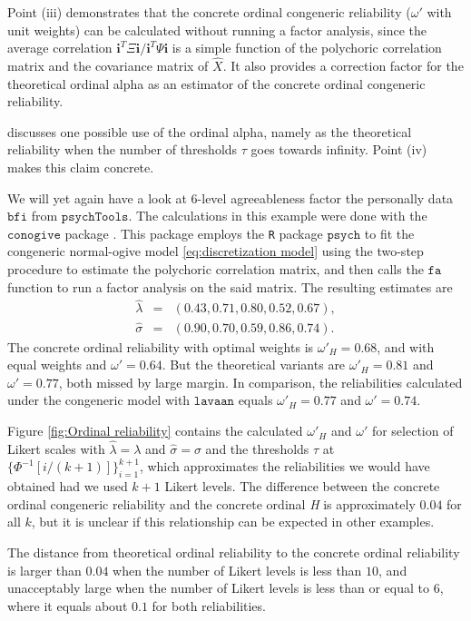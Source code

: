 \documentclass[twoside]{article}
\begin{document}
Point (iii) demonstrates that the concrete ordinal congeneric reliability ($\omega'$ with unit weights) can be
calculated without running a factor analysis, since the average correlation
$\mathbf{i}^{T}\Xi\mathbf{i}/\mathbf{i}^{T}\Psi\mathbf{i}$ is a simple
function of the polychoric correlation matrix and the covariance matrix
of $\hat{X}.$ It also provides a correction factor for the theoretical ordinal alpha as an estimator of the concrete ordinal congeneric reliability.

\citet[p. 1068]{Chalmers2018-fj} discusses one possible use of the
ordinal alpha, namely as the theoretical reliability when the number
of thresholds $\tau$ goes towards infinity. Point (iv) makes this
claim concrete.

\begin{example}
We will yet again have a look at $6$-level agreeableness factor the
personally data $\mathtt{bfi}$ from $\mathtt{psychTools}$. The calculations in this example were done with the $\mathtt{conogive}$ package \citep{conogive}. This package employs the \texttt{R} package $\mathtt{psych}$ \citep{psych} to fit the congeneric normal-ogive
model \eqref{eq:discretization model} using the two-step procedure
to estimate the polychoric correlation matrix, and then calls the $\mathtt{fa}$ function to run a factor analysis on the said matrix.
The resulting estimates are 
\begin{eqnarray*}
\hat{\lambda} & = & (0.43,0.71,0.80,0.52,0.67),\\
\hat{\sigma} & = & (0.90,0.70,0.59,0.86,0.74).
\end{eqnarray*} The concrete ordinal reliability
with optimal weights is $\omega'_{H}=0.68$, and with equal weights
and $\omega'=0.64$. But the theoretical variants are $\omega'_{H}=0.81$
and $\omega'=0.77$, both missed by large margin. In comparison, the
reliabilities calculated under the congeneric model with $\mathtt{lavaan}$ \citep{Rosseel2012-yg}
equals $\omega'_{H}=0.77$ and $\omega'=0.74$.

Figure \ref{fig:Ordinal reliability} contains the calculated $\omega'_{H}$ and $\omega'$ for selection of Likert
scales with $\hat{\lambda} = \lambda$ and $\hat{\sigma}=\sigma$ and
the thresholds $\tau$ at $\{\Phi^{-1}[i/(k+1)]\}_{i=1}^{k+1}$, which
approximates the reliabilities we would have obtained had we used
$k+1$ Likert levels. The difference between the concrete ordinal congeneric reliability and the concrete ordinal \textit{H} is approximately $0.04$ for all $k$, but it is unclear if this relationship can be expected in other examples.

The distance from theoretical ordinal reliability to the concrete ordinal reliability is larger than $0.04$ when the number of Likert levels is less than $10$, and unacceptably large when the number of Likert levels is less than or equal to $6$, where it equals about $0.1$ for both reliabilities.
\end{example}
\end{document}
